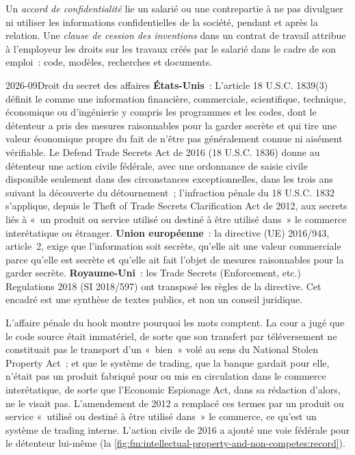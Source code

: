 \begin{definition}\label{def:fm:intellectual-property-and-non-competes:nda}
Un \emph{accord de confidentialité} lie un salarié ou une contrepartie à ne pas divulguer ni utiliser les informations confidentielles de la
société, pendant et après la relation. Une \emph{clause de cession des inventions} dans
un contrat de travail attribue à l'employeur les droits sur les travaux créés par le salarié dans le cadre de son emploi~: code, modèles, recherches et
documents.
\end{definition}

\begin{dated}{2026-09}{Droit du secret des affaires}\label{dat:fm:intellectual-property-and-non-competes:law}
\textbf{États-Unis}~: L'article 18 U.S.C. 1839(3) définit le  comme une information financière, commerciale, scientifique, technique, économique ou d'ingénierie
y compris les programmes et les codes, dont le détenteur a pris des mesures raisonnables pour la garder secrète et qui tire une valeur économique propre
du fait de n'être pas généralement connue ni aisément vérifiable. Le Defend Trade Secrets Act de 2016 (18 U.S.C. 1836) donne au détenteur une action civile fédérale,
avec une ordonnance de saisie civile disponible seulement dans des circonstances exceptionnelles, dans les trois ans suivant la découverte du détournement~;
l'infraction pénale du 18 U.S.C. 1832 s'applique, depuis le Theft of Trade Secrets Clarification Act de 2012, aux secrets liés à «~un produit ou
service utilisé ou destiné à être utilisé dans~» le commerce interétatique ou étranger. \textbf{Union européenne}~: la directive (UE) 2016/943, article~2, exige
que l'information soit secrète, qu'elle ait une valeur commerciale parce qu'elle est secrète et qu'elle ait fait l'objet de mesures raisonnables pour la garder secrète.
\textbf{Royaume-Uni}~: les Trade Secrets (Enforcement, etc.) Regulations 2018 (SI 2018/597) ont transposé les règles de la directive. Cet encadré est une
synthèse de textes publics, et non un conseil juridique.
\end{dated}

L'affaire pénale du hook montre pourquoi les mots comptent. La cour a jugé que le code source était immatériel, de sorte que son transfert par téléversement ne constituait pas
le transport d'un «~bien~» volé au sens du National Stolen Property Act~; et que le système de trading, que la banque gardait pour elle, n'était pas
un produit fabriqué pour ou mis en circulation dans le commerce interétatique, de sorte que l'Economic Espionage Act, dans sa rédaction d'alors, ne le visait pas. L'amendement de 2012 a remplacé
ces termes par un produit ou service «~utilisé ou destiné à être utilisé dans~» le commerce, ce qu'est un système de trading interne. L'action civile de 2016
a ajouté une voie fédérale pour le détenteur lui-même (la \cref{fig:fm:intellectual-property-and-non-competes:record}).

